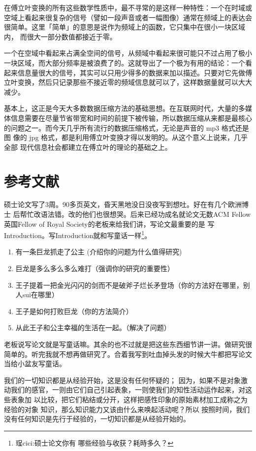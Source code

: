 在傅立叶变换的所有这些数学性质中，最不寻常的是这样一种特性：一个在时域或
空域上看起来很复杂的信号（譬如一段声音或者一幅图像）通常在频域上的表达会
很简单。这里「简单」的意思是说作为频域上的函数，它只集中在很小一块区域内，
而很大一部分数值都接近于零。

一个在空域中看起来占满全空间的信号，从频域中看起来很可能只不过占用了极小
一块区域，而大部分频率是被浪费了的。这就导出了一个极为有用的结论：一个看
起来信息量很大的信号，其实可以只用少得多的数据来加以描述。只要对它先做傅
立叶变换，然后只记录那些不接近零的频域信息就可以了，这样数据量就可以大大
减少。

基本上，这正是今天大多数数据压缩方法的基础思想。在互联网时代，大量的多媒
体信息需要在尽量节省带宽和时间的前提下被传输，所以数据压缩从来都是最核心
的问题之一。而今天几乎所有流行的数据压缩格式，无论是声音的 mp3 格式还是图
像的 jpg 格式，都是利用傅立叶变换才得以发明的。从这个意义上说来，几乎全部
现代信息社会都建立在傅立叶的理论的基础之上。



\section{参考文献}


硕士论文写了3周。90多页英文，昏天黑地没日没夜写到想吐。好在有几个欧洲博士
后帮忙改语法错。改的他们也很想哭。后来已经功成名就论文无数ACM
Fellow英国Fellow of Royal Society的老板来给我们讲，写论文最重要的是
写Introduction。写Introduction就和写童话一样\footnote{珵cici:硕士论文你有
  哪些经验与收获？耗時多久？}。

\begin{enumerate}[1.]
\item 有一条巨龙抓走了公主 (介绍你的问题为什么值得研究)
\item 巨龙是多么多么多么难打（强调你的研究的重要性）
\item 王子提着一把金光闪闪的剑而不是破斧子烂长矛登场（你的方法好在哪里，别人sui在哪里）
\item 王子是如何打败巨龙（你的方法简介）
\item 从此王子和公主幸福的生活在一起。（解决了问题）
\end{enumerate}

老板说写论文就是写童话嘛。其余的也不过就是把这些东西细节讲一讲。做研究很
简单的。听完我就不想再做研究了。合着我写到吐血掉头发的时候大牛都把写论文
当给小盆友写童话。


我们的一切知识都是从经验开始\cite{李秋零1999}，这是没有任何怀疑的\cite{邓晓芒2005}\cite{邓晓芒2000}；
因为，如果不是对象激动我们的感官，一则由它们自己引起表象，一则使我们的知性活动运作起来，对这些表象加
以比较，把它们粘结或分开，\cite{欧进萍1999,欧进萍1991}这样把感性印象的原始素材加工成称之为经验的对象
知识，那么知识能力又该由什么来唤起活动呢？\cite{braun2007,kelton2002,strawderman2001,李秋零1999}所以
按照时间，我们没有任何知识是先行于经验的，一切知识都是从经验开始的。

